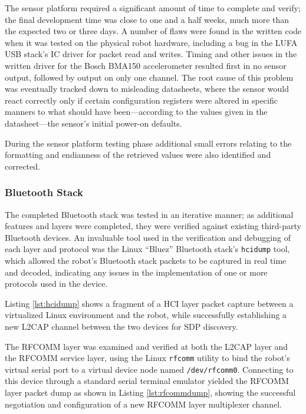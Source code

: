 The sensor platform required a significant amount of time to complete and verify; the final development time was close to one and a half weeks, much more than the expected two or three days. A number of flaws were found in the written code when it was tested on the physical robot hardware, including a bug in the LUFA USB stack's IC driver for packet read and writes. Timing and other issues in the written driver for the Bosch BMA150 accelerometer resulted first in no sensor output, followed by output on only one channel. The root cause of this problem was eventually tracked down to misleading datasheets, where the sensor would react correctly only if certain configuration registers were altered in specific manners to what should have been---according to the values given in the datasheet---the sensor's initial power-on defaults.

During the sensor platform testing phase additional small errors relating to the formatting and endianness of the retrieved values were also identified and corrected.

\FloatBarrier
\subsubsection{Bluetooth Stack}

The completed Bluetooth stack was tested in an iterative manner; as additional features and layers were completed, they were verified against existing third-party Bluetooth devices. An invaluable tool used in the verification and debugging of each layer and protocol was the Linux ``Bluez'' Bluetooth stack's \texttt{hcidump} tool, which allowed the robot's Bluetooth stack packets to be captured in real time and decoded, indicating any issues in the implementation of one or more protocols used in the device.

Listing \ref{lst:hcidump} shows a fragment of a HCI layer packet capture between a virtualized Linux environment and the robot, while successfully establishing a new L2CAP channel between the two devices for SDP discovery.



The RFCOMM layer was examined and verified at both the L2CAP layer and the RFCOMM service layer, using the Linux \texttt{rfcomm} utility to bind the robot's virtual serial port to a virtual device node named \texttt{/dev/rfcomm0}. Connecting to this device through a standard serial terminal emulator yielded the RFCOMM layer packet dump as shown in Listing \ref{lst:rfcommdump}, showing the successful negotiation and configuration of a new RFCOMM layer multiplexer channel.

